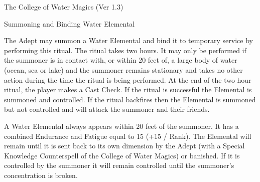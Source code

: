 \begin{Chapter}{The College of Water Magics (Ver 1.3)}
\begin{ritual}[R-1]{Summoning and Binding Water Elemental}
\begin{effects}
The Adept may summon a Water Elemental and bind it to temporary
service by performing this ritual.  The ritual takes two hours.  It
may only be performed if the summoner is in contact with, or within 20
feet of, a large body of water (ocean, sea or lake) and the summoner
remains stationary and takes no other action during the time the
ritual is being performed. At the end of the two hour ritual, the
player makes a Cast Check.  If the ritual is successful the Elemental
is summoned and controlled.  If the ritual backfires then the
Elemental is summoned but not controlled and will attack the summoner
and their friends.

A Water Elemental always appears within 20 feet of the summoner. It
has a combined Endurance and Fatigue equal to 15 (+15 / Rank).  The
Elemental will remain until it is sent back to its own dimension by
the Adept (with a Special Knowledge Counterspell of the College of
Water Magics) or banished. If it is controlled by the summoner it will
remain controlled until the summoner’s concentration is broken.
\end{effects}
\end{ritual}

\end{Chapter}
